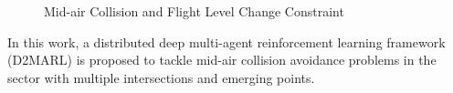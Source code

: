 \begin{figure}[H]
    \centering
    \caption{Mid-air Collision and Flight Level Change Constraint}
    \label{fig:collision_level_change}
\end{figure}

In this work, a distributed deep multi-agent reinforcement learning framework (D2MARL) is proposed to tackle mid-air collision avoidance problems in the sector with multiple intersections and emerging points. 